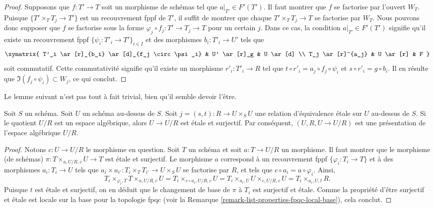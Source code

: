 \begin{proof}
\medskip\noindent
Supposons que $f : T' \to T$ soit un morphisme de schémas
tel que $a|_{T'} \in F'(T')$. Il faut montrer que
$f$ se factorise par l'ouvert $W_T$. Puisque
$\{T' \times_T T_j \to T'\}$ est un recouvrement fppf de $T'$,
il suffit de montrer que chaque $T' \times_T T_j \to T$
se factorise par $W_T$. Nous pouvons donc supposer que $f$ se factorise
sous la forme $\varphi_j \circ f_j : T' \to T_j \to T$ pour un certain $j$.
Dans ce cas, la condition $a|_{T'} \in F'(T')$ signifie qu'il existe
un recouvrement fppf $\{\psi_i : T'_i \to T'\}_{i \in I}$ et des
morphismes $b_i : T'_i \to U'$ tels que
$$
\xymatrix{
T'_i \ar[r]_{b_i} \ar[d]_{f_j \circ \psi_i} & U' \ar[r]_g & U \ar[d] \\
T_j \ar[r]^{a_j} & U \ar[r] & F
}
$$
soit commutatif. Cette commutativité signifie qu'il existe un
morphisme $r'_i : T'_i \to R$ tel que
$t \circ r'_i = a_j \circ f_j \circ \psi_i$ et
$s \circ r'_i = g \circ b_i$. Il en résulte que
$\Im(f_j \circ \psi_i) \subset W_j$, ce qui conclut.
\end{proof}

\noindent
Le lemme suivant n'est pas tout à fait trivial, bien qu'il semble
devoir l'être.

\begin{lemma}
\label{lemma-when-it-works-it-works}
Soit $S$ un schéma. Soit $U$ un schéma au-dessus de $S$.
Soit $j = (s, t) : R \to U \times_S U$
une relation d'équivalence \'etale sur $U$ au-dessus de $S$.
Si le quotient $U/R$ est un espace algébrique, alors
$U \to U/R$ est \'etale et surjectif. Par conséquent,
$(U, R, U \to U/R)$ est une présentation de l'espace
algébrique $U/R$.
\end{lemma}

\begin{proof}
Notons $c : U \to U/R$ le morphisme en question.
Soit $T$ un schéma et soit $a : T \to U/R$ un morphisme.
Il faut montrer que le morphisme (de schémas)
$\pi : T \times_{a, U/R, c} U \to T$ est \'etale et surjectif.
Le morphisme $a$ correspond à un recouvrement fppf
$\{\varphi_i : T_i \to T\}$ et à des morphismes $a_i : T_i \to U$ tels
que
$a_i \times a_{i'} : T_i \times_T T_{i'} \to U \times_S U$
se factorise par $R$, et tels que $c \circ a_i = a \circ \varphi_i$.
Ainsi,
$$
T_i \times_{\varphi_i, T} T \times_{a, U/R, c} U =
T_i \times_{c \circ a_i, U/R, c} U =
T_i \times_{a_i, U} U \times_{c, U/R, c} U = T_i \times_{a_i, U, t} R.
$$
Puisque $t$ est \'etale et surjectif, on en déduit que
le changement de base de $\pi$ à $T_i$ est surjectif et \'etale.
Comme la propriété d'être surjectif et \'etale est locale
sur la base pour la topologie fpqc (voir la
Remarque \ref{remark-list-properties-fpqc-local-base}),
cela conclut.
\end{proof}

